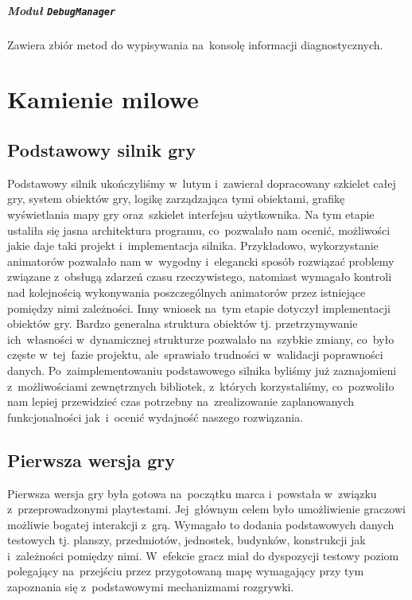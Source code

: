 \documentclass[licencjacka]{pracamgr}
\begin{document}
    \paragraph{Moduł \texttt{DebugManager}}
      Zawiera zbiór metod do wypisywania na~konsolę informacji diagnostycznych.

  \chapter{Kamienie milowe}
    \section{Podstawowy silnik gry}
    Podstawowy silnik ukończyliśmy w~lutym i~zawierał dopracowany szkielet całej gry, system obiektów gry,
    logikę zarządzająca tymi obiektami, grafikę wyświetlania mapy gry oraz~szkielet interfejsu użytkownika.
    Na tym etapie ustaliła się jasna architektura programu, co~pozwalało nam ocenić, możliwości jakie
    daje taki projekt i~implementacja silnika. Przykładowo, wykorzystanie animatorów pozwalało nam w~wygodny
    i~elegancki sposób rozwiązać problemy związane z~obsługą zdarzeń czasu rzeczywistego, natomiast wymagało kontroli
    nad kolejnością wykonywania poszczególnych animatorów przez istniejące pomiędzy nimi zależności. Inny wniosek
    na~tym etapie dotyczył implementacji obiektów gry. Bardzo generalna struktura obiektów tj. przetrzymywanie
    ich~własności w~dynamicznej strukturze pozwalało na~szybkie zmiany, co~było częste w~tej~fazie projektu,
    ale~sprawiało trudności w~walidacji poprawności danych.
    Po~zaimplementowaniu podstawowego silnika byliśmy już zaznajomieni z~możliwościami zewnętrznych bibliotek,
    z~których korzystaliśmy, co~pozwoliło nam lepiej przewidzieć czas potrzebny na~zrealizowanie zaplanowanych
    funkcjonalności jak~i~ocenić wydajność naszego rozwiązania.

    \section{Pierwsza wersja gry}
    Pierwsza wersja gry była gotowa na~początku marca i~powstała w~związku z~przeprowadzonymi playtestami. Jej~głównym
    celem było umożliwienie graczowi możliwie bogatej interakcji z~grą. Wymagało to dodania podstawowych
    danych testowych tj. planszy, przedmiotów, jednostek, budynków, konstrukcji jak i~zależności pomiędzy nimi.
    W~efekcie gracz miał do dyspozycji testowy poziom polegający na~przejściu przez przygotowaną mapę wymagający
    przy tym zapoznania się z~podstawowymi mechanizmami rozgrywki.
\end{document}
